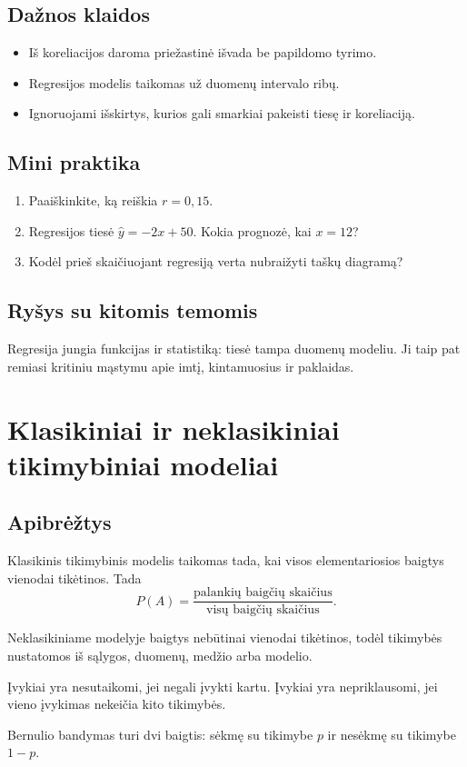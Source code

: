 \subsection{Dažnos klaidos}
\begin{itemize}
\item Iš koreliacijos daroma priežastinė išvada be papildomo tyrimo.
\item Regresijos modelis taikomas už duomenų intervalo ribų.
\item Ignoruojami išskirtys, kurios gali smarkiai pakeisti tiesę ir koreliaciją.
\end{itemize}

\subsection{Mini praktika}
\begin{enumerate}[label=\alph*)]
\item Paaiškinkite, ką reiškia \(r=0{,}15\).
\item Regresijos tiesė \(\hat y=-2x+50\). Kokia prognozė, kai \(x=12\)?
\item Kodėl prieš skaičiuojant regresiją verta nubraižyti taškų diagramą?
\end{enumerate}

\subsection{Ryšys su kitomis temomis}
Regresija jungia funkcijas ir statistiką: tiesė tampa duomenų modeliu. Ji taip pat remiasi kritiniu mąstymu apie imtį, kintamuosius ir paklaidas.

\section{Klasikiniai ir neklasikiniai tikimybiniai modeliai}\label{sec:klasikiniai-ir-neklasikiniai-tikimybiniai-modeliai}

\subsection{Apibrėžtys}
\begin{apibreztis}
Klasikinis tikimybinis modelis taikomas tada, kai visos elementariosios baigtys vienodai tikėtinos. Tada
\[
P(A)=\frac{\text{palankių baigčių skaičius}}{\text{visų baigčių skaičius}}.
\]
\end{apibreztis}
\begin{apibreztis}
Neklasikiniame modelyje baigtys nebūtinai vienodai tikėtinos, todėl tikimybės nustatomos iš sąlygos, duomenų, medžio arba modelio.
\end{apibreztis}
\begin{apibreztis}
Įvykiai yra nesutaikomi, jei negali įvykti kartu. Įvykiai yra nepriklausomi, jei vieno įvykimas nekeičia kito tikimybės.
\end{apibreztis}
\begin{apibreztis}
Bernulio bandymas turi dvi baigtis: sėkmę su tikimybe \(p\) ir nesėkmę su tikimybe \(1-p\).
\end{apibreztis}

